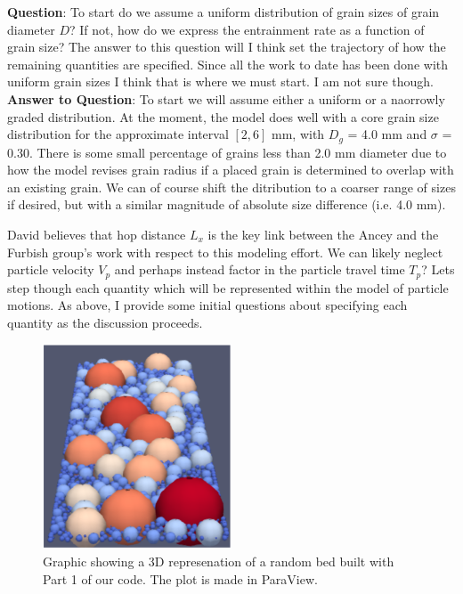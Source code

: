 \documentclass[12pt]{article}
\begin{document}
\begin{outline}
\1 \textbf{Question}: To start do we assume a uniform distribution of grain sizes of grain diameter $D$? If not, how do we express the entrainment rate as a function of grain size? The answer to this question will I think set the trajectory of how the remaining quantities are specified. Since all the work to date has been done with uniform grain sizes I think that is where we must start. I am not sure though.
\1 \textbf{Answer to Question}: To start we will assume either a uniform or a naorrowly graded distribution. At the moment, the model does well with a core grain size distribution for the approximate interval $[2,6]$ mm, with $D_g$ = 4.0 mm and $\sigma$ = 0.30. There is some small percentage of grains less than 2.0 mm diameter due to how the model revises grain radius if a placed grain is determined to overlap with an existing grain. We can of course shift the ditribution to a coarser range of sizes if desired, but with a similar magnitude of absolute size difference (i.e. 4.0 mm).
\end{outline}
David believes that hop distance $L_x$ is the key link between the Ancey and the Furbish group's work with respect to this modeling effort. We can likely neglect particle velocity $V_p$ and perhaps instead factor in the particle travel time $T_p$? Lets step though each quantity which will be represented within the model of particle motions. As above, I provide some initial questions about specifying each quantity as the discussion proceeds.
\begin{figure}[!ht]
	\centering
		\includegraphics[width=0.5\textwidth]{Figures/Circles3D.pdf}
		\caption{Graphic showing a 3D represenation of a random bed built with Part 1 of our code. The plot is made in ParaView.}
	\label{Fig:3D}
\end{figure}
\end{document}
